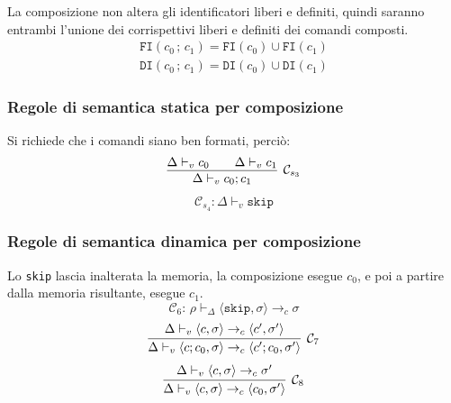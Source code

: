 \documentclass[oneside,a4paper,11pt]{book}
\theoremstyle{italicstyle}
\theoremstyle{normStyle}
\begin{document}
La composizione non altera gli identificatori liberi e definiti, quindi saranno entrambi l'unione dei corrispettivi liberi e definiti dei comandi composti.
\begin{align*}
  \texttt{FI}(c_0\,;\,c_1) = \texttt{FI}(c_0) \cup \texttt{FI}(c_1)\\
  \texttt{DI}(c_0\,;\,c_1)= \texttt{DI}(c_0) \cup \texttt{DI}(c_1)
\end{align*}
\subsubsection{Regole di semantica statica per composizione}
Si richiede che i comandi siano ben formati, perciò:
\[
  \infer[\mathcal{C}_{s_3}]
  {
    \Delta \vdash_v c_0;c_1
  }
  {
    \Delta \vdash_v c_0 \qquad \Delta \vdash_v c_1
  }
\]
\[
  \mathcal{C}_{s_4}:\Delta \vdash_v \texttt{skip}
\]
\subsubsection{Regole di semantica dinamica per composizione}
Lo \verb|skip| lascia inalterata la memoria, la composizione esegue $c_0$,
e poi a partire dalla memoria risultante, esegue $c_1$.
\[
  \mathcal{C}_6 :\,\rho \vdash_\Delta \langle \texttt{skip}, \sigma \rangle
  \rightarrow_c \sigma
\]
\[
  \infer[\mathcal{C}_{7}]
  {
    \Delta \vdash_v \langle c;c_0 ,\sigma \rangle \rightarrow_c \langle c';c_0 ,\sigma' \rangle 
  }
  {
    \Delta \vdash_v \langle c ,\sigma \rangle \rightarrow_c \langle c' ,\sigma' \rangle
  }
\]
\[
  \infer[\mathcal{C}_{8}]
  {
    \Delta \vdash_v \langle c ,\sigma \rangle \rightarrow_c \langle c_0 ,\sigma' \rangle 
  }
  {
    \Delta \vdash_v \langle c ,\sigma \rangle \rightarrow_c \sigma'
  }
\]
\end{document}
